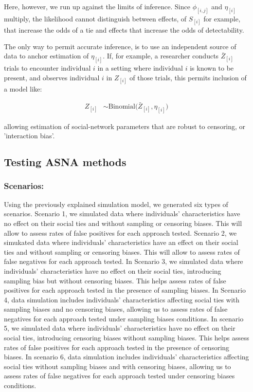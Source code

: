 \documentclass[Afour,sageh,times]{sagej}
\begin{document}
Here, however, we run up against the limits of inference. Since $\phi_{[i,j]}$ and $\eta_{[i]}$ multiply, the likelihood cannot distinguish between effects, of $S_{[i]}$ for example, that increase the odds of a tie and effects that increase the odds of detectability.

The only way to permit accurate inference, is to use an independent source of data to anchor estimation of $\eta_{[i]}$. If, for example, a researcher conducts $\bar Z_{[i]}$ trials to encounter individual $i$ in a setting where individual $i$ is known to be present, and observes individual $i$ in $Z_{[i]}$ of those trials, this permits inclusion of a model like:
\begin{ceqn}
\begin{align}\label{maineq2}
 Z_{[i]} &\sim \mathrm{Binomial}\Big(\bar Z_{[i]}, \eta_{[i]} \Big)
\end{align}
\end{ceqn}
allowing estimation of social-network parameters that are robust to censoring, or 'interaction bias'.

\subsection{Testing ASNA methods}
\subsubsection{Scenarios:} 
Using the previously explained simulation model, we generated six types of scenarios. Scenario 1, we simulated data where individuals' characteristics have no effect on their social ties and without sampling or censoring biases. This will allow to assess rates of false positives for each approach tested. Scenario 2, we simukated data where individuals' characteristics have an effect on their social ties and without sampling or censoring biases. This will allow to assess rates of false negatives for each approach tested. 
In Scenario 3, we simulated data where individuals' characteristics have no effect on their social ties, introducing sampling bias but without censoring biases. This helps assess rates of false positives for each approach tested in the presence of sampling biases. In Scenario 4, data simulation includes individuals' characteristics affecting social ties with sampling biases and no censoring biases, allowing us to assess rates of false negatives for each approach tested under sampling biases conditions. In scenario 5, we simulated data where individuals' characteristics have no effect on their social ties, introducing censoring biases without sampling biases. This helps assess rates of false positives for each approach tested in the presence of censoring biases. In scenario 6, data simulation includes individuals' characteristics affecting social ties without sampling biases and with censoring biases, allowing us to assess rates of false negatives for each approach tested under censoring biases conditions. 
\end{document}
